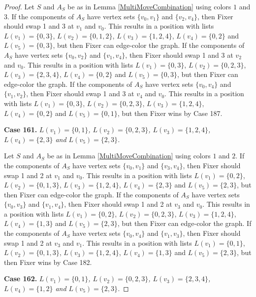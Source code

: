 \documentclass[12pt]{amsart}
\theoremstyle{plain}
\theoremstyle{definition}
\theoremstyle{remark}
\begin{document}
\begin{proof}
Let $S$ and $A_S$ be as in Lemma \ref{MultiMoveCombination} using colors $1$ and $3$. If the components of $A_S$ have vertex sets $\{v_0, v_1\}$ and $\{v_2, v_4\}$, then Fixer should swap 1 and 3 at $v_1$ and $v_0$. This results in a position with lists $L(v_1) = \{0, 3\}$, $L(v_2) = \{0, 1, 2\}$, $L(v_3) = \{1, 2, 4\}$, $L(v_4) = \{0, 2\}$ and $L(v_5) = \{0, 3\}$, but then Fixer can edge-color the graph.
If the components of $A_S$ have vertex sets $\{v_0, v_2\}$ and $\{v_1, v_4\}$, then Fixer should swap 1 and 3 at $v_2$ and $v_0$. This results in a position with lists $L(v_1) = \{0, 3\}$, $L(v_2) = \{0, 2, 3\}$, $L(v_3) = \{2, 3, 4\}$, $L(v_4) = \{0, 2\}$ and $L(v_5) = \{0, 3\}$, but then Fixer can edge-color the graph.
If the components of $A_S$ have vertex sets $\{v_0, v_4\}$ and $\{v_1, v_2\}$, then Fixer should swap 1 and 3 at $v_4$ and $v_0$. This results in a position with lists $L(v_1) = \{0, 3\}$, $L(v_2) = \{0, 2, 3\}$, $L(v_3) = \{1, 2, 4\}$, $L(v_4) = \{0, 2\}$ and $L(v_5) = \{0, 1\}$, but then Fixer wins by Case 187.

\noindent\textbf{Case 161.  }\textit{$L(v_1) = \{0, 1\}$, $L(v_2) = \{0, 2, 3\}$, $L(v_3) = \{1, 2, 4\}$, $L(v_4) = \{2, 3\}$ and $L(v_5) = \{2, 3\}$.}

Let $S$ and $A_S$ be as in Lemma \ref{MultiMoveCombination} using colors $1$ and $2$. If the components of $A_S$ have vertex sets $\{v_0, v_1\}$ and $\{v_3, v_4\}$, then Fixer should swap 1 and 2 at $v_1$ and $v_0$. This results in a position with lists $L(v_1) = \{0, 2\}$, $L(v_2) = \{0, 1, 3\}$, $L(v_3) = \{1, 2, 4\}$, $L(v_4) = \{2, 3\}$ and $L(v_5) = \{2, 3\}$, but then Fixer can edge-color the graph.
If the components of $A_S$ have vertex sets $\{v_0, v_3\}$ and $\{v_1, v_4\}$, then Fixer should swap 1 and 2 at $v_3$ and $v_0$. This results in a position with lists $L(v_1) = \{0, 2\}$, $L(v_2) = \{0, 2, 3\}$, $L(v_3) = \{1, 2, 4\}$, $L(v_4) = \{1, 3\}$ and $L(v_5) = \{2, 3\}$, but then Fixer can edge-color the graph.
If the components of $A_S$ have vertex sets $\{v_0, v_4\}$ and $\{v_1, v_3\}$, then Fixer should swap 1 and 2 at $v_3$ and $v_1$. This results in a position with lists $L(v_1) = \{0, 1\}$, $L(v_2) = \{0, 1, 3\}$, $L(v_3) = \{1, 2, 4\}$, $L(v_4) = \{1, 3\}$ and $L(v_5) = \{2, 3\}$, but then Fixer wins by Case 182.

\noindent\textbf{Case 162.  }\textit{$L(v_1) = \{0, 1\}$, $L(v_2) = \{0, 2, 3\}$, $L(v_3) = \{2, 3, 4\}$, $L(v_4) = \{1, 2\}$ and $L(v_5) = \{2, 3\}$.}


\end{proof}
\end{document}
